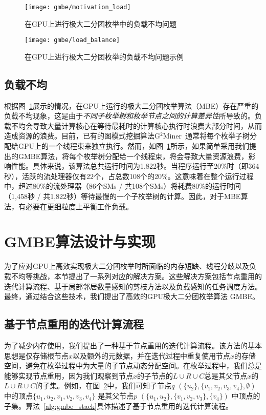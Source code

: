\begin{figure} [t]
  \center
    \vspace{0.1in}
		\texttt{[image: gmbe/motivation\_load]}
    \vspace{0.1in}
	\caption{在GPU上进行极大二分团枚举中的负载不均问题}
	\label{fig:gmbe_load_reason}
\end{figure}

\begin{figure} [t]
  \center
    \vspace{0.1in}
		\texttt{[image: gmbe/load\_balance]}
    \vspace{0.1in}
	\caption{在GPU上进行极大二分团枚举的负载不均问题示例}
	\label{fig:gmbe_load_example}
\end{figure}
\subsection{负载不均}

根据图~\ref{fig:gmbe_load_reason}展示的情况，在GPU上运行的极大二分团枚举算法（MBE）存在严重的负载不均现象，这是由于\emph{不同子枚举树和枚举节点之间的计算差异性}所导致的。负载不均会导致大量计算核心在等待最耗时的计算核心执行时浪费大部分时间，从而造成资源的浪费。目前，已有的图模式挖掘算法G$^2$Miner~\cite{g2miner22}通常将每个枚举子树分配给GPU上的一个线程束来独立执行。然而，如图~\ref{fig:gmbe_load_reason}所示，如果简单采用我们提出的GMBE算法，将每个枚举树分配给一个线程束，将会导致大量资源浪费，影响性能。具体来说，该算法总共运行时间为1,822秒。当程序运行至20\%时（即364秒），活跃的流处理器仅有22个，占总数108个的20\%。这意味着在整个运行过程中，超过80\%的流处理器（86个SMs / 共108个SMs）将耗费80\%的运行时间（1,458秒 / 共1,822秒）等待最慢的一个子枚举树的计算。因此，对于MBE算法，有必要在更细粒度上平衡工作负载。



\section{GMBE算法设计与实现}
为了应对GPU上高效实现极大二分团枚举时所面临的内存短缺、线程分歧以及负载不均等挑战，本节提出了一系列对应的解决方案。这些解决方案包括节点重用的迭代计算流程、基于局部邻居数量感知的剪枝方法以及负载感知的任务调度方法。最终，通过结合这些技术，我们提出了高效的GPU极大二分团枚举算法 GMBE。


\subsection{基于节点重用的迭代计算流程}
\label{subsec:gmbe_memory}
为了减少内存使用，我们提出了一种基于节点重用的迭代计算流程。该方法的基本思想是仅存储根节点$x$以及额外的元数据，并在迭代过程中重复使用节点$x$的存储空间，避免在枚举过程中为大量的子节点动态分配空间。在枚举过程中，我们总是能够实现节点重用，因为我们观察到节点$x$的子节点的$L\cup  R\cup C$总是其父节点$x$的$L\cup  R\cup C$的子集。例如，在图~\ref{fig:gmbe_load_example}中，我们可知子节点$q$ $(\{u_2\},\{v_1, v_2, v_3, v_4\}, \emptyset)$ 中的顶点$\{u_1, u_2, v_1, v_2, v_3, v_4\}$ 是其父节点$p$ $(\{u_1, u_2\}, \{v_1, v_2, v_3\},\{v_4\})$ 中顶点的子集。算法~\ref{alg:gmbe_stack}具体描述了基于节点重用的迭代计算流程。


